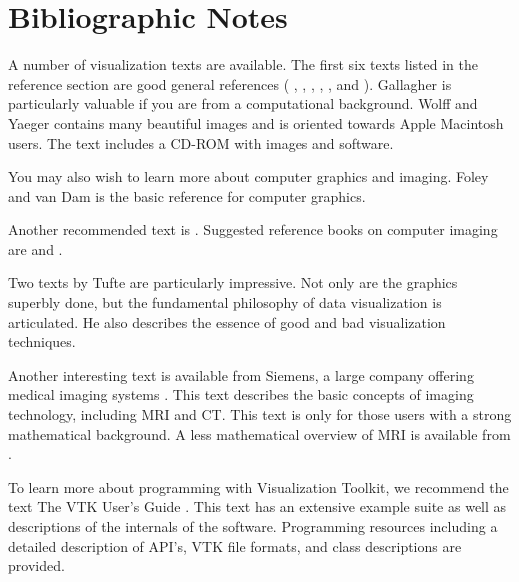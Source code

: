 \section{Bibliographic Notes}

A number of visualization texts are available. The first six texts listed in the reference section are good general references ( \cite{Nielson90}, \cite{Patrikalakis91}, \cite{Brodlie92}, \cite{Wolff93}, \cite{Rosenblum94}, and\cite{Gallagher95} ). Gallagher \cite{Gallagher95} is particularly valuable if you are from a computational background. Wolff and Yaeger \cite{Wolff93} contains many beautiful images and is oriented towards Apple Macintosh users. The text includes a CD-ROM with images and software.

You may also wish to learn more about computer graphics and imaging. Foley and van Dam \cite{FoleyVanDam90} is the basic reference for computer graphics. 

Another recommended text is \cite{BurgerGillies89}. Suggested reference books on computer imaging are \cite{Pavlidis82} and \cite{Wolberg90}.

Two texts by Tufte \cite{Tufte83} \cite{Tufte90} are particularly impressive. Not only are the graphics superbly done, but the fundamental philosophy of data visualization is articulated. He also describes the essence of good and bad visualization techniques.

Another interesting text is available from Siemens, a large company offering medical imaging systems \cite{Krestel90}. This text describes the basic concepts of imaging technology, including MRI and CT. This text is only for those users with a strong mathematical background. A less mathematical
overview of MRI is available from \cite{SmithRanallo89}.

To learn more about programming with Visualization Toolkit, we recommend the text The VTK User’s Guide \cite{UsersGuide}. This text has an extensive example suite as well as descriptions of
the internals of the software. Programming resources including a detailed description of API’s, VTK file formats, and class descriptions are provided.

\printbibliography
